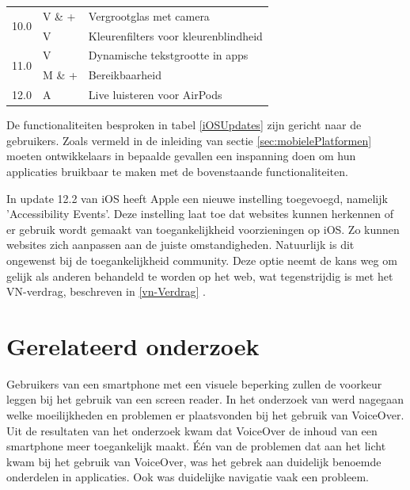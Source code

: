 \begin{table} [h]
\begin{tabular}{|l|l|l|}
           \hline
           \multirow{2}{*}{10.0} & V \& +                & Vergrootglas met camera                     \\ 
           \cline{2-3}
           & V               & Kleurenfilters voor kleurenblindheid        \\ 
           \hline
            \multirow{2}{*}{11.0} & V               & Dynamische tekstgrootte in apps                     \\ 
            \cline{2-3}
           & M \& +               & Bereikbaarheid        \\ 
           \hline
           12.0                  & A               & Live luisteren voor AirPods                 \\
           \hline
      
       \end{tabular}

\end{table}

De functionaliteiten besproken in tabel \ref{iOSUpdates} zijn gericht naar de gebruikers. Zoals vermeld in de inleiding van sectie \ref{sec:mobielePlatformen} moeten ontwikkelaars in bepaalde gevallen een inspanning doen om hun applicaties bruikbaar te maken met de bovenstaande functionaliteiten.

In update 12.2 van iOS heeft Apple een nieuwe instelling toegevoegd, namelijk 'Accessibility Events'. Deze instelling laat toe dat websites kunnen herkennen of er gebruik wordt gemaakt van toegankelijkheid voorzieningen op iOS. Zo kunnen websites zich aanpassen aan de juiste omstandigheden. Natuurlijk is dit ongewenst bij de toegankelijkheid community. Deze optie neemt de kans weg om gelijk als anderen behandeld te worden op het web, wat tegenstrijdig is met het VN-verdrag, beschreven in \ref{vn-Verdrag} \autocite{digitalApartheid}.

\section{Gerelateerd onderzoek}

Gebruikers van een smartphone met een visuele beperking zullen de voorkeur leggen bij het gebruik van een screen reader. In het onderzoek van \cite{shokuhi2017study} werd nagegaan welke moeilijkheden en problemen er plaatsvonden bij het gebruik van VoiceOver. Uit de resultaten van het onderzoek kwam dat VoiceOver de inhoud van een smartphone meer toegankelijk maakt. Één van de problemen dat aan het licht kwam bij het gebruik van VoiceOver, was het gebrek aan duidelijk benoemde onderdelen in applicaties. Ook was duidelijke navigatie vaak een probleem.

